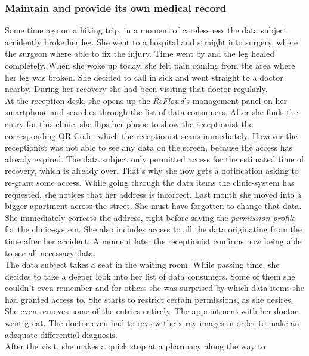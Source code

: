 \documentclass[12pt,english,a4paper,titlepage,cleardoublepage=empty,dottedtoc]{report}
\begin{document}
\subsubsection*{Maintain and provide its own medical
record}\label{maintain-and-provide-its-own-medical-record}

Some time ago on a hiking trip, in a moment of carelessness the data
subject accidently broke her leg. She went to a hospital and straight
into surgery, where the surgeon where able to fix the injury. Time went
by and the leg healed completely. When she woke up today, she felt pain
coming from the area where her leg was broken. She decided to call in
sick and went straight to a doctor nearby. During her recovery she had
been visiting that doctor regularly.\\
At the reception desk, she opens up the \emph{ReFlowd}'s management
panel on her smartphone and searches through the list of data consumers.
After she finds the entry for this clinic, she flips her phone to show
the receptionist the corresponding QR-Code, which the receptionist scans
immediately. However the receptionist was not able to see any data on
the screen, because the access has already expired. The data subject
only permitted access for the estimated time of recovery, which is
already over. That's why she now gets a notification asking to re-grant
some access. While going through the data items the clinic-system has
requested, she notices that her address is incorrect. Last month she
moved into a bigger apartment across the street. She must have forgotten
to change that data. She immediately corrects the address, right before
saving the \emph{permission profile} for the clinic-system. She also
includes access to all the data originating from the time after her
accident. A moment later the receptionist confirms now being able to see
all necessary data.\\
The data subject takes a seat in the waiting room. While passing time,
she decides to take a deeper look into her list of data consumers. Some
of them she couldn't even remember and for others she was surprised by
which data items she had granted access to. She starts to restrict
certain permissions, as she desires. She even removes some of the
entries entirely. The appointment with her doctor went great. The doctor
even had to review the x-ray images in order to make an adequate
differential diagnosis.\\
After the visit, she makes a quick stop at a pharmacy along the way to
\end{document}
